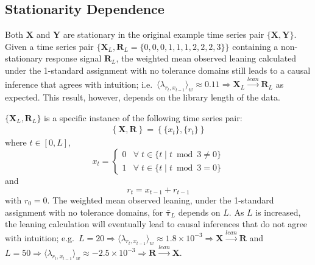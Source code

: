 \documentclass[twocolumn,aps,pre,groupedaddress]{revtex4-1}
\begin{document}
\subsection{Stationarity Dependence}
Both $\mathbf{X}$ and $\mathbf{Y}$ are stationary in the original example time series pair $\{\mathbf{X},\mathbf{Y}\}$.  Given a time series pair $\{\mathbf{X}_L,\mathbf{R}_L = \{0,0,0,1,1,1,2,2,2,3\}\}$ containing a non-stationary response signal $\mathbf{R}_L$, the weighted mean observed leaning calculated under the 1-standard assignment with no tolerance domains still leads to a causal inference that agrees with intuition; i.e.\ $\langle \lambda_{r_t,x_{t-1}} \rangle_w \approx 0.11 \Rightarrow \mathbf{X}_L\xrightarrow{lean}\mathbf{R}_L$ as expected.  This result, however, depends on the library length of the data.

$\{\mathbf{X}_L,\mathbf{R}_L\}$ is a specific instance of the following time series pair:
\begin{eqnarray}
\left\{\mathbf{X},\mathbf{R}\right\} = \left\{\{x_t\},\{r_t\}\right\}
\end{eqnarray}
where $t\in[0,L]$,
\begin{equation}
x_t = \left\{
  \begin{array}{lr}
    0 & \forall\; t\in\{t\;|\;t\bmod 3 \neq 0\}\\
    1 & \forall\; t\in\{t\;|\;t\bmod 3 = 0\}
  \end{array}
\right.
\end{equation}
and
\begin{equation}
r_t = x_{t-1}+r_{t-1}
\end{equation}
with $r_0 = 0$.  The weighted mean observed leaning, under the 1-standard assignment with no tolerance domains, for $\bar{\mathbf{\tau}}_L$ depends on $L$.  As $L$ is increased, the leaning calculation will eventually lead to causal inferences that do not agree with intuition; e.g.\ $L = 20 \Rightarrow \langle \lambda_{r_t,x_{t-1}} \rangle_w \approx 1.8\times10^{-3} \Rightarrow \mathbf{X}\xrightarrow{lean}\mathbf{R}$ and $L = 50 \Rightarrow \langle \lambda_{r_t,x_{t-1}} \rangle_w \approx -2.5\times10^{-3} \Rightarrow \mathbf{R}\xrightarrow{lean}\mathbf{X}$.  
\end{document}
